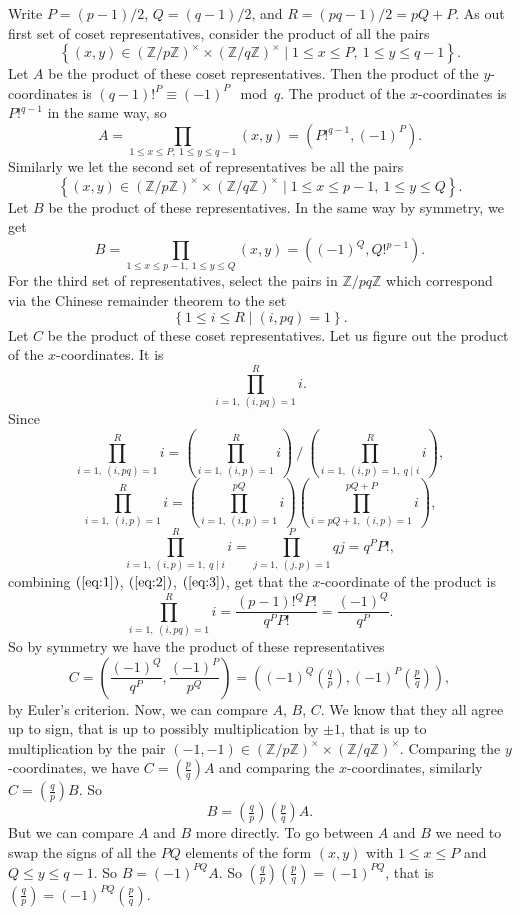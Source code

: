 \documentclass{article}
\newcommand{\Z}{\mathbb{Z}}
\newcommand{\rb}[1]{\left( #1 \right)}
\newcommand{\cb}[1]{\left\{ #1 \right\}}
\newcommand{\unit}[1]{\rb{\Z / #1\Z}^\times}
\newcommand{\legendre}[2]{\rb{\tfrac{#1}{#2}}}
\theoremstyle{definition}\newtheorem{definition}{Definition}
\theoremstyle{definition}\newtheorem{remark}[definition]{Remark}
\theoremstyle{definition}\newtheorem*{example}{Example}
\theoremstyle{definition}\newtheorem*{note}{Note}
\begin{document}
Write $ P = \rb{p - 1} / 2 $, $ Q = \rb{q - 1} / 2 $, and $ R = \rb{pq - 1} / 2 = pQ + P $. As out first set of coset representatives, consider the product of all the pairs
$$ \cb{\rb{x, y} \in \unit{p} \times \unit{q} \mid 1 \le x \le P, \ 1 \le y \le q - 1}. $$ Let $ A $ be the product of these coset representatives. Then the product of the $ y $-coordinates is $ \rb{q - 1}!^P \equiv \rb{-1}^P \mod q $. The product of the $ x $-coordinates is $ P!^{q - 1} $ in the same way, so
$$ A = \prod_{1 \le x \le P, \ 1 \le y \le q - 1} \rb{x, y} = \rb{P!^{q - 1}, \rb{-1}^P}. $$
Similarly we let the second set of representatives be all the pairs
$$ \cb{\rb{x, y} \in \unit{p} \times \unit{q} \mid 1 \le x \le p - 1, \ 1 \le y \le Q}. $$
Let $ B $ be the product of these representatives. In the same way by symmetry, we get
$$ B = \prod_{1 \le x \le p - 1, \ 1 \le y \le Q} \rb{x, y} = \rb{\rb{-1}^Q, Q!^{p - 1}}. $$
For the third set of representatives, select the pairs in $ \Z / pq\Z $ which correspond via the Chinese remainder theorem to the set
$$ \cb{1 \le i \le R \mid \rb{i, pq} = 1}. $$
Let $ C $ be the product of these coset representatives. Let us figure out the product of the $ x $-coordinates. It is
$$ \prod_{i = 1, \ \rb{i, pq} = 1}^R i. $$
Since
\begin{equation}
\label{eq:1}
\prod_{i = 1, \ \rb{i, pq} = 1}^R i = \rb{\prod_{i = 1, \ \rb{i, p} = 1}^R i} \ \Bigg/ \ \rb{\prod_{i = 1, \ \rb{i, p} = 1, \ q \mid i}^R i},
\end{equation}
\begin{equation}
\label{eq:2}
\prod_{i = 1, \ \rb{i, p} = 1}^R i = \rb{\prod_{i = 1, \ \rb{i, p} = 1}^{pQ} i}\rb{\prod_{i = pQ + 1, \ \rb{i, p} = 1}^{pQ + P} i},
\end{equation}
\begin{equation}
\label{eq:3}
\prod_{i = 1, \ \rb{i, p} = 1, \ q \mid i}^{R} i = \prod_{j = 1, \ \rb{j, p} = 1}^{P} qj = q^PP!,
\end{equation}
combining $ \rb{\ref{eq:1}} $, $ \rb{\ref{eq:2}} $, $ \rb{\ref{eq:3}} $, get that the $ x $-coordinate of the product is
$$ \prod_{i = 1, \ \rb{i, pq} = 1}^R i = \dfrac{\rb{p - 1}!^QP!}{q^PP!} = \dfrac{\rb{-1}^Q}{q^P}. $$
So by symmetry we have the product of these representatives
$$ C = \rb{\dfrac{\rb{-1}^Q}{q^P}, \dfrac{\rb{-1}^P}{p^Q}} = \rb{\rb{-1}^Q\legendre{q}{p}, \rb{-1}^P\legendre{p}{q}}, $$
by Euler's criterion. Now, we can compare $ A $, $ B $, $ C $. We know that they all agree up to sign, that is up to possibly multiplication by $ \pm 1 $, that is up to multiplication by the pair $ \rb{-1, -1} \in \unit{p} \times \unit{q} $. Comparing the $ y $-coordinates, we have $ C = \legendre{p}{q}A $ and comparing the $ x $-coordinates, similarly $ C = \legendre{q}{p}B $. So
$$ B = \legendre{q}{p}\legendre{p}{q}A. $$
But we can compare $ A $ and $ B $ more directly. To go between $ A $ and $ B $ we need to swap the signs of all the $ PQ $ elements of the form $ \rb{x, y} $ with $ 1 \le x \le P $ and $ Q \le y \le q - 1 $. So $ B = \rb{-1}^{PQ}A $. So $ \legendre{q}{p}\legendre{p}{q} = \rb{-1}^{PQ} $, that is $ \legendre{q}{p} = \rb{-1}^{PQ}\legendre{p}{q} $.
\end{document}
